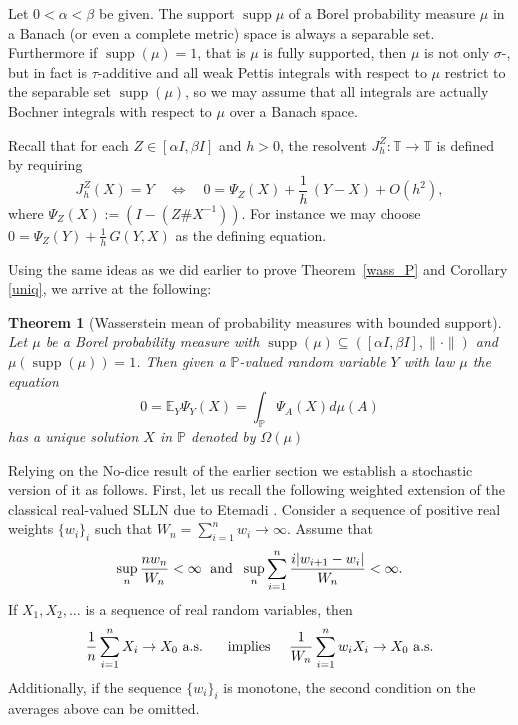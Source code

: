 \documentclass[12pt,reqno]{amsart}
\newtheorem{theorem}{Theorem}[section]
\DeclareMathOperator{\supp}{\mathrm{supp}}
\begin{document}
Let $0<\alpha<\beta$ be given. The support $\supp{\mu}$ of a Borel probability measure $\mu$ in a Banach (or even a complete metric) space is always a separable set. Furthermore if $\supp(\mu)=1$, that is $\mu$ is fully supported, then $\mu$ is not only $\sigma$-, but in fact is $\tau$-additive and all weak Pettis integrals with respect to $\mu$ restrict to the separable set $\supp(\mu)$, so we may assume that all integrals are actually Bochner integrals with respect to $\mu$ over a Banach space.

Recall that for each $Z\in[\alpha I,\beta I]$ and \(h>0\), the resolvent
\(J_h^{Z}:\mathbb{T}\to \mathbb{T}\) is defined by requiring
\begin{equation}\label{eq:def-normalized-resolvent-Z}
J_h^{Z}(X)=Y
\quad\Longleftrightarrow\quad
0=\Psi_Z(X)+\frac1h\,(Y-X)+O(h^2),
\end{equation}
where $\Psi_Z(X):=(I-(Z\# X^{-1}))$. For instance we may choose $0=\Psi_Z(Y)+\frac1h\,G(Y,X)$ as the defining equation.

Using the same ideas as we did earlier to prove Theorem~\ref{wass_P} and Corollary \ref{uniq}, we arrive at the following:

\begin{theorem}[Wasserstein mean of probability measures with bounded support]\label{wass_P2}
Let $\mu$ be a Borel probability measure with $\supp(\mu)\subseteq([\alpha I,\beta I],\|\cdot\|)$ and $\mu(\supp(\mu))=1$. Then given a $\mathbb{P}$-valued random variable $Y$ with law $\mu$ the equation
\begin{equation}
0=\mathbb{E}_Y\Psi_Y(X)=\int_{\mathbb{P}}\Psi_A(X)d\mu(A)
\end{equation}
has a unique solution $X$ in $\mathbb{P}$ denoted by $\Omega (\mu)$
\end{theorem}

Relying on the No-dice result of the earlier section we establish a stochastic version of it as follows. First, let us recall the following weighted extension of the classical real-valued SLLN due to Etemadi \cite[Theorem 1]{Etemadi}. Consider a sequence of positive real weights $\{w_i\}_i$ such that $W_n = \sum_{i=1}^n w_i \rightarrow \infty$. Assume that
  $$ \sup_n {nw_n \over W_n} < \infty \; \mbox{ and } \; \sup_n \sum_{i=1}^n {i|w_{i+1} - w_i| \over W_n} < \infty.$$
  If $X_1, X_2, \hdots$ is a sequence of real random variables, then
   $$ {1 \over n }\sum_{i=1}^n X_i \rightarrow X_0 \mbox{ a.s. } \quad  \mbox{ implies } \quad {1 \over W_n }\sum_{i=1}^n w_iX_i \rightarrow X_0 \mbox{ a.s.} $$
  Additionally, if the sequence $\{w_i\}_i$
 is monotone, the second condition on the averages above can be omitted.
\end{document}
